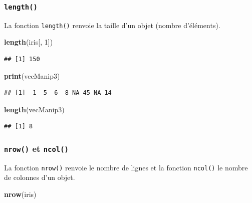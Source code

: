 \documentclass[
]{book}
\newenvironment{Shaded}{\begin{snugshade}}{\end{snugshade}}
\newcommand{\DecValTok}[1]{\textcolor[rgb]{0.00,0.00,0.81}{#1}}
\newcommand{\KeywordTok}[1]{\textcolor[rgb]{0.13,0.29,0.53}{\textbf{#1}}}
\newcommand{\NormalTok}[1]{#1}
\begin{document}
\hypertarget{l015length}{%
\subsubsection{\texorpdfstring{\texttt{length()}}{length()}}\label{l015length}}

La fonction \texttt{length()} renvoie la taille d'un objet (nombre d'éléments).

\begin{Shaded}
\begin{Highlighting}[]
\KeywordTok{length}\NormalTok{(iris[, }\DecValTok{1}\NormalTok{])}
\end{Highlighting}
\end{Shaded}

\begin{verbatim}
## [1] 150
\end{verbatim}

\begin{Shaded}
\begin{Highlighting}[]
\KeywordTok{print}\NormalTok{(vecManip3)}
\end{Highlighting}
\end{Shaded}

\begin{verbatim}
## [1]  1  5  6  8 NA 45 NA 14
\end{verbatim}

\begin{Shaded}
\begin{Highlighting}[]
\KeywordTok{length}\NormalTok{(vecManip3)}
\end{Highlighting}
\end{Shaded}

\begin{verbatim}
## [1] 8
\end{verbatim}

\hypertarget{l015nrow}{%
\subsubsection{\texorpdfstring{\texttt{nrow()} et \texttt{ncol()}}{nrow() et ncol()}}\label{l015nrow}}

La fonction \texttt{nrow()} renvoie le nombre de lignes et la fonction \texttt{ncol()} le nombre de colonnes d'un objet.

\begin{Shaded}
\begin{Highlighting}[]
\KeywordTok{nrow}\NormalTok{(iris)}
\end{Highlighting}
\end{Shaded}
\end{document}
